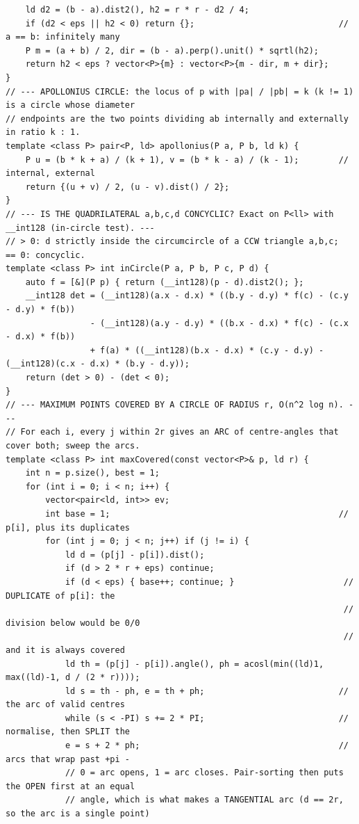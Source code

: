 \documentclass[9pt,a4paper,twocolumn]{extarticle}
\begin{document}
\begin{lstlisting}
    ld d2 = (b - a).dist2(), h2 = r * r - d2 / 4;
    if (d2 < eps || h2 < 0) return {};                             // a == b: infinitely many
    P m = (a + b) / 2, dir = (b - a).perp().unit() * sqrtl(h2);
    return h2 < eps ? vector<P>{m} : vector<P>{m - dir, m + dir};
}
// --- APOLLONIUS CIRCLE: the locus of p with |pa| / |pb| = k (k != 1) is a circle whose diameter
// endpoints are the two points dividing ab internally and externally in ratio k : 1.
template <class P> pair<P, ld> apollonius(P a, P b, ld k) {
    P u = (b * k + a) / (k + 1), v = (b * k - a) / (k - 1);        // internal, external
    return {(u + v) / 2, (u - v).dist() / 2};
}
// --- IS THE QUADRILATERAL a,b,c,d CONCYCLIC? Exact on P<ll> with __int128 (in-circle test). ---
// > 0: d strictly inside the circumcircle of a CCW triangle a,b,c;  == 0: concyclic.
template <class P> int inCircle(P a, P b, P c, P d) {
    auto f = [&](P p) { return (__int128)(p - d).dist2(); };
    __int128 det = (__int128)(a.x - d.x) * ((b.y - d.y) * f(c) - (c.y - d.y) * f(b))
                 - (__int128)(a.y - d.y) * ((b.x - d.x) * f(c) - (c.x - d.x) * f(b))
                 + f(a) * ((__int128)(b.x - d.x) * (c.y - d.y) - (__int128)(c.x - d.x) * (b.y - d.y));
    return (det > 0) - (det < 0);
}
// --- MAXIMUM POINTS COVERED BY A CIRCLE OF RADIUS r, O(n^2 log n). ---
// For each i, every j within 2r gives an ARC of centre-angles that cover both; sweep the arcs.
template <class P> int maxCovered(const vector<P>& p, ld r) {
    int n = p.size(), best = 1;
    for (int i = 0; i < n; i++) {
        vector<pair<ld, int>> ev;
        int base = 1;                                              // p[i], plus its duplicates
        for (int j = 0; j < n; j++) if (j != i) {
            ld d = (p[j] - p[i]).dist();
            if (d > 2 * r + eps) continue;
            if (d < eps) { base++; continue; }                      // DUPLICATE of p[i]: the
                                                                    // division below would be 0/0
                                                                    // and it is always covered
            ld th = (p[j] - p[i]).angle(), ph = acosl(min((ld)1, max((ld)-1, d / (2 * r))));
            ld s = th - ph, e = th + ph;                           // the arc of valid centres
            while (s < -PI) s += 2 * PI;                           // normalise, then SPLIT the
            e = s + 2 * ph;                                        // arcs that wrap past +pi -
            // 0 = arc opens, 1 = arc closes. Pair-sorting then puts the OPEN first at an equal
            // angle, which is what makes a TANGENTIAL arc (d == 2r, so the arc is a single point)

\end{lstlisting}
\end{document}

